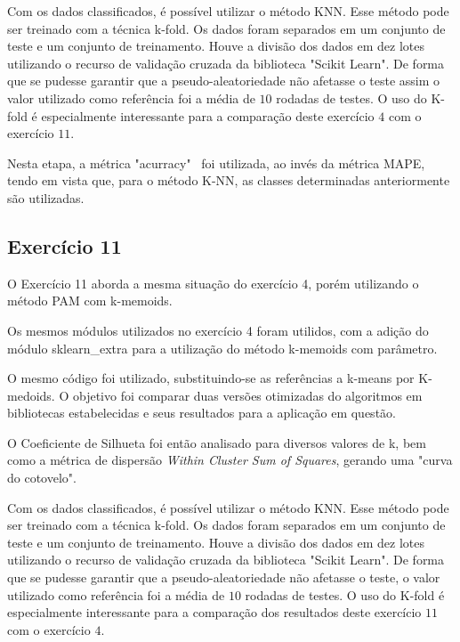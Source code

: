 Com os dados classificados, é possível utilizar o método KNN. Esse método pode ser treinado com a técnica k-fold. Os dados  foram separados em um conjunto de teste e um conjunto de treinamento. Houve a divisão dos dados em dez lotes utilizando o recurso de validação cruzada da biblioteca "Scikit Learn". De forma que se pudesse garantir que a pseudo-aleatoriedade não afetasse o teste assim o valor utilizado como referência foi a média de $10$ rodadas de testes. O uso do K-fold é especialmente interessante para a comparação deste exercício $4$ com o exercício $11$.



Nesta etapa, a métrica "acurracy" \ foi utilizada, ao invés da métrica MAPE, tendo em vista que, para o método K-NN, as classes determinadas anteriormente são utilizadas.


\subsection{Exercício 11}

O Exercício 11 aborda a mesma situação do exercício 4, porém utilizando o método PAM com k-memoids.

Os mesmos módulos utilizados no exercício 4 foram utilidos, com a adição do módulo sklearn\_extra para a utilização do método k-memoids com parâmetro.

O mesmo código foi utilizado, substituindo-se as referências a k-means por K-medoids. O objetivo foi comparar duas versões otimizadas do algoritmos em bibliotecas estabelecidas e seus resultados para a aplicação em questão.

O Coeficiente de Silhueta foi então analisado para diversos valores de k, bem como a métrica de dispersão \textit{Within Cluster Sum of Squares}, gerando uma "curva do cotovelo".

Com os dados classificados, é possível utilizar o método KNN. Esse método pode ser treinado com a técnica k-fold. Os dados  foram separados em um conjunto de teste e um conjunto de treinamento. Houve a divisão dos dados em dez lotes utilizando o recurso de validação cruzada da biblioteca "Scikit Learn". De forma que se pudesse garantir que a pseudo-aleatoriedade não afetasse o teste, o valor utilizado como referência foi a média de $10$ rodadas de testes. O uso do K-fold é especialmente interessante para a comparação dos resultados deste exercício $11$ com o exercício $4$.

